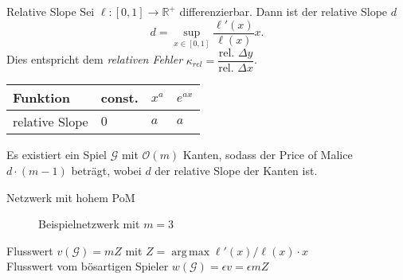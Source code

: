 \documentclass{beamer}
\DeclareMathOperator*{\argmax}{arg\,max}
\begin{document}
\begin{frame}{Relative Slope}
	Sei $\ell : [0,1] \to \mathbb R^+$ differenzierbar.
	Dann ist der \alert{relative Slope} $d$
	\[ d = \sup_{x \in [0,1]} \dfrac{\ell'(x)}{\ell(x)} x .\]
	Dies entspricht dem \emph{relativen Fehler} $\kappa_{rel} = \dfrac{\text{rel. } \Delta y}{\text{rel. } \Delta x}$.
	
	\begin{table}[]
		\begin{tabular}{@{}llll@{}}
			\toprule
			Funktion       & const. & $x^a$ & $e^{ax}$ \\ \midrule
			relative Slope & $0$      & $a$     & $a$        \\ \bottomrule
		\end{tabular}
	\end{table}
	\begin{theorem}
		Es existiert ein Spiel $\mathcal G$ mit $\mathcal O(m)$ Kanten, sodass der Price of Malice $d \cdot (m-1)$ beträgt, wobei $d$ der relative Slope der Kanten ist.
	\end{theorem}
\end{frame}

\begin{frame}{Netzwerk mit hohem PoM}
	\begin{figure}
	\caption{Beispielnetzwerk mit $m=3$}
	\end{figure}
	
	Flusswert $v(\mathcal G) = mZ$ mit $Z = \argmax \ell'(x)/\ell(x) \cdot x$ \\
	Flusswert vom bösartigen Spieler $w(\mathcal G) = \epsilon v = \epsilon m Z$
\end{frame}
\end{document}
